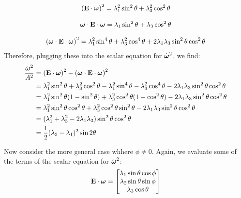 \documentclass[extra,mreferee]{gji}
\begin{document}
\begin{equation}
\left(\mathbf{E}\cdot \mitbf{\omega}\right)^2 = \lambda_1^2 \sin^2{\theta} + \lambda_3^2 \cos^2{\theta}
\end{equation}

\begin{equation}
\mitbf{\omega} \cdot \mathbf{E} \cdot \mitbf{\omega} = 
\lambda_1 \sin^2{\theta} + \lambda_3 \cos^2{\theta}
\end{equation}

\begin{equation}
\left(\mitbf{\omega} \cdot \mathbf{E} \cdot \mitbf{\omega} \right)^2 =  
\lambda_1^2 \sin^4{\theta} + \lambda_3^2 \cos^4{\theta} + 2 \lambda_1 \lambda_3 \sin^2{\theta} \cos^2{\theta}
\end{equation}
Therefore, plugging these into the scalar equation for $\dot{\mitbf{\omega}}^2$, we find:
\begin{equation}
\begin{aligned}
\frac{\dot{\mitbf{\omega}}^2}{A^2}  &= 
 \left(\mathbf{E}\cdot \mitbf{\omega}\right)^2
 - \left(\mitbf{\omega} \cdot \mathbf{E} \cdot \mitbf{\omega} \right)^2  \\
 &= \lambda_1^2 \sin^2{\theta} + \lambda_3^2 \cos^2{\theta}
 - \lambda_1^2 \sin^4{\theta} - \lambda_3^2 \cos^4{\theta} - 2 \lambda_1 \lambda_3 \sin^2{\theta} \cos^2{\theta} \\
 &= \lambda_1^2 \sin^2{\theta} (1 - \sin^2{\theta}) + \lambda_3^2 \cos^2{\theta} (1 - \cos^2{\theta})
  - 2 \lambda_1 \lambda_3 \sin^2{\theta} \cos^2{\theta} \\
 &= \lambda_1^2 \sin^2{\theta} \cos^2{\theta} + \lambda_3^2 \cos^2{\theta} \sin^2{\theta}
  - 2 \lambda_1 \lambda_3 \sin^2{\theta} \cos^2{\theta} \\
 &= (\lambda_1^2 + \lambda_3^2 - 2 \lambda_1 \lambda_3) \sin^2{\theta} \cos^2{\theta} \\
 &= \frac{1}{2} (\lambda_3 - \lambda_1)^2 \sin{2 \theta} \\
\end{aligned}
\end{equation}

Now consider the more general case whhere $\phi \ne 0$.
Again, we evaluate some of the terms of the scalar equation for $\dot{\mitbf{\omega}}^2$:
\begin{equation}
\mathbf{E}\cdot \mitbf{\omega} = 
\begin{bmatrix}
\lambda_1 \sin{\theta} \cos{\phi}\\
\lambda_2 \sin{\theta} \sin{\phi} \\
\lambda_3 \cos{\theta}
\end{bmatrix}
\end{equation}
\end{document}
